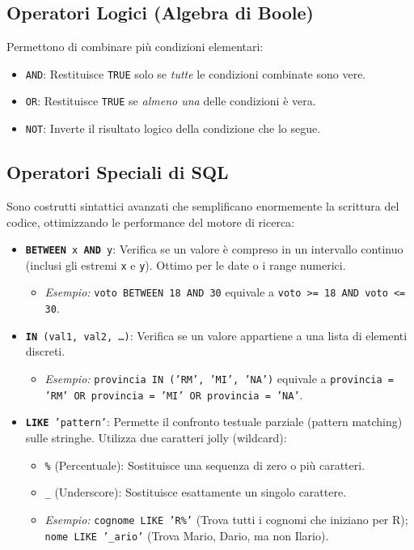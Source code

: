 \subsection*{Operatori Logici (Algebra di Boole)}
Permettono di combinare più condizioni elementari:
\begin{itemize}
    \item \texttt{AND}: Restituisce \texttt{TRUE} solo se \textit{tutte} le condizioni combinate sono vere.
    \item \texttt{OR}: Restituisce \texttt{TRUE} se \textit{almeno una} delle condizioni è vera.
    \item \texttt{NOT}: Inverte il risultato logico della condizione che lo segue.
\end{itemize}

\subsection*{Operatori Speciali di SQL}
Sono costrutti sintattici avanzati che semplificano enormemente la scrittura del codice, ottimizzando le performance del motore di ricerca:
\begin{itemize}
    \item \texttt{\textbf{BETWEEN} x \textbf{AND} y}: Verifica se un valore è compreso in un intervallo continuo (inclusi gli estremi \texttt{x} e \texttt{y}). Ottimo per le date o i range numerici.
    \begin{itemize}
        \item \textit{Esempio:} \texttt{voto BETWEEN 18 AND 30} equivale a \texttt{voto >= 18 AND voto <= 30}.
    \end{itemize}
    
    \item \texttt{\textbf{IN} (val1, val2, \dots)}: Verifica se un valore appartiene a una lista di elementi discreti.
    \begin{itemize}
        \item \textit{Esempio:} \texttt{provincia IN ('RM', 'MI', 'NA')} equivale a \texttt{provincia = 'RM' OR provincia = 'MI' OR provincia = 'NA'}.
    \end{itemize}
    
    \item \texttt{\textbf{LIKE} 'pattern'}: Permette il confronto testuale parziale (pattern matching) sulle stringhe. Utilizza due caratteri jolly (wildcard):
    \begin{itemize}
        \item \texttt{\%} (Percentuale): Sostituisce una sequenza di zero o più caratteri.
        \item \texttt{\_} (Underscore): Sostituisce esattamente un singolo carattere.
        \item \textit{Esempio:} \texttt{cognome LIKE 'R\%'} (Trova tutti i cognomi che iniziano per R); \texttt{nome LIKE '\_ario'} (Trova Mario, Dario, ma non Ilario).
    \end{itemize}
\end{itemize}

